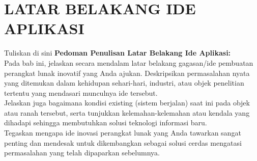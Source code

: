 \chapter{LATAR BELAKANG IDE APLIKASI}


Tuliskan di sini \textbf{Pedoman Penulisan Latar Belakang Ide Aplikasi:} \\
Pada bab ini, jelaskan secara mendalam latar belakang gagasan/ide pembuatan perangkat lunak inovatif yang Anda ajukan. Deskripsikan permasalahan nyata yang ditemukan dalam kehidupan sehari-hari, industri, atau objek penelitian tertentu yang mendasari munculnya ide tersebut.\\
Jelaskan juga bagaimana kondisi existing (sistem berjalan) saat ini pada objek atau ranah tersebut, serta tunjukkan kelemahan-kelemahan atau kendala yang dihadapi sehingga membutuhkan solusi teknologi informasi baru.\\
Tegaskan mengapa ide inovasi perangkat lunak yang Anda tawarkan sangat penting dan mendesak untuk dikembangkan sebagai solusi cerdas mengatasi permasalahan yang telah dipaparkan sebelumnya.

